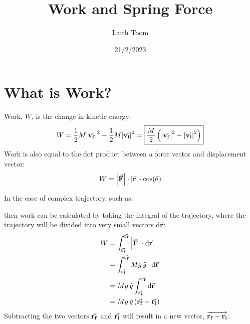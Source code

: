 \documentclass{article}
\title{Work and Spring Force}
\author{Laith Toom}
\date{21/2/2023}
\begin{document}
\maketitle
\tableofcontents 

\newpage 

\section{What is Work?}
Work, $W$, is the change in kinetic energy:
\[ W = \frac{1}{2}M\abs{\va{v_f}}^2 - \frac{1}{2}M\abs{\va{v_i}}^2 = \boxed{ \frac{M}{2} \left(\abs{\va{v_f}}^2 - \abs{\va{v_i}}^2 \right) } \]
Work is also equal to the dot product between a force vector and displacement vector:
\[ W = \abs{\va{F}}\cdot\abs{\va{r}}\cdot\cos(\theta) \]

In the case of complex trajectory, such as:
\begin{figure}[H]
    \centering
\end{figure}
then work can be calculated by taking the integral of the trajectory, where 
the trajectory will be divided into very small vectors $\mathrm{d}\va{r}$:
{\large
\begin{align}
    W &= \int_{\va{r_i}}^{\va{r_f}} \abs{\va{F}} \cdot \mathrm{d}\va{r} \\
      &= \int_{\va{r_i}}^{\va{r_f}} Mg\,\hat{y} \cdot \mathrm{d}\va{r} \\
      &= Mg\,\hat{y} \int_{\va{r_i}}^{\va{r_f}} \mathrm{d}\va{r} \\
      &= Mg\,\hat{y} \left(\va{r_f} - \va{r_i}\right)
\end{align}
}
\newpage
Subtracting the two vectors $\va{r_f}$ and $\va{r_i}$ will result in a new vector,
$\overrightarrow{\bf{r_f-r_i}}$:
\begin{figure}[H]
    \centering
\end{figure}
\end{document}

